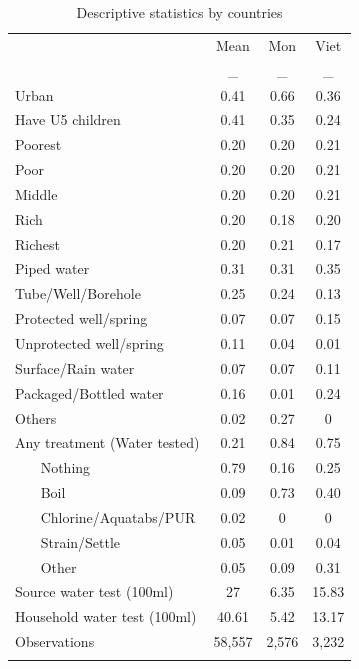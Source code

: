 \begin{table}[htbp]\centering
\def\sym#1{\ifmmode^{#1}\else\(^{#1}\)\fi}
\caption{Descriptive statistics by countries \label{Outside}}
\begin{tabular}{l*{3}{c}}
\hline\hline
                    &\multicolumn{1}{c}{Mean}&\multicolumn{1}{c}{Mon}&\multicolumn{1}{c}{Viet}\\
                    &           _&           _&           _\\
\hline
Urban               &        0.41&        0.66&        0.36\\
Have U5 children    &        0.41&        0.35&        0.24\\
Poorest             &        0.20&        0.20&        0.21\\
Poor                &        0.20&        0.20&        0.21\\
Middle              &        0.20&        0.20&        0.21\\
Rich                &        0.20&        0.18&        0.20\\
Richest             &        0.20&        0.21&        0.17\\
Piped water         &        0.31&        0.31&        0.35\\
Tube/Well/Borehole  &        0.25&        0.24&        0.13\\
Protected well/spring&        0.07&        0.07&        0.15\\
Unprotected well/spring&        0.11&        0.04&        0.01\\
Surface/Rain water  &        0.07&        0.07&        0.11\\
Packaged/Bottled water&        0.16&        0.01&        0.24\\
Others              &        0.02&        0.27&        0\\
Any treatment (Water tested)&        0.21&        0.84&        0.75\\
~~~ Nothing      &        0.79&        0.16&        0.25\\
~~~ Boil         &        0.09&        0.73&        0.40\\
~~~ Chlorine/Aquatabs/PUR&        0.02&        0&        0\\
~~~ Strain/Settle&        0.05&        0.01&        0.04\\
~~~ Other        &        0.05&        0.09&        0.31\\
Source water test (100ml)&       27&        6.35&       15.83\\
Household water test (100ml)&       40.61&        5.42&       13.17\\
\hline
Observations        &      58,557&       2,576&       3,232\\
\hline\hline
\multicolumn{4}{p{0.87\linewidth}}{\footnotesize }\\
\end{tabular}
\end{table}

